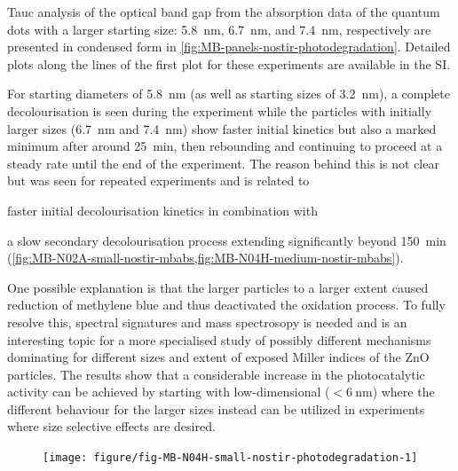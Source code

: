 \documentclass[9pt,twoside,twocolumn]{article}\usepackage{knitr}
\begin{document}
\begin{refsection}
Tauc analysis of the optical band gap from the absorption data of the  quantum dots with a larger starting size: \qty{5.8}{\nm}, \qty{6.7}{\nm}, and \qty{7.4}{\nm}, respectively are presented in condensed form in \cref{fig:MB-panels-nostir-photodegradation}. Detailed plots along the lines of the first plot for these experiments are available in the SI.

For starting diameters of \qty{5.8}{\nm} (as well as starting sizes of \qty{3.2}{\nm}), a complete decolourisation is seen during the experiment while the particles with initially larger sizes (\qty{6.7}{\nm} and \qty{7.4}{\nm}) show faster initial kinetics but also a marked minimum after around \qty{25}{\minute}, then rebounding and continuing to proceed at a steady rate until the end of the experiment. The reason behind this is not clear but was seen for repeated experiments and is related to \begin{enumerate*}[label=\alph*)]%
\item faster initial decolourisation kinetics in combination with
\item a slow secondary decolourisation process extending significantly beyond \qty{150}{\minute} (\cref{fig:MB-N02A-small-nostir-mbabs,fig:MB-N04H-medium-nostir-mbabs}).
\end{enumerate*}
One possible explanation is that the larger particles to a larger extent caused reduction of methylene blue and thus deactivated the oxidation process. To fully resolve this, spectral signatures and mass spectrosopy is needed and is an interesting topic for a more specialised study of possibly different mechanisms dominating for different sizes and extent of exposed Miller indices of the ZnO particles. The results show that a considerable increase in the photocatalytic activity can be achieved by starting with low-dimensional  ($<\qty{6}{\nm}$) where the different behaviour for the larger sizes instead can be utilized in experiments where size selective effects are desired.


\begin{figure}[tbp]
\centering
\begin{knitrout}\footnotesize
{}\color{fgcolor}

{\centering \texttt{[image: figure/fig-MB-N04H-small-nostir-photodegradation-1]} 

}



\end{knitrout}
\end{figure}
\end{refsection}
\end{document}
